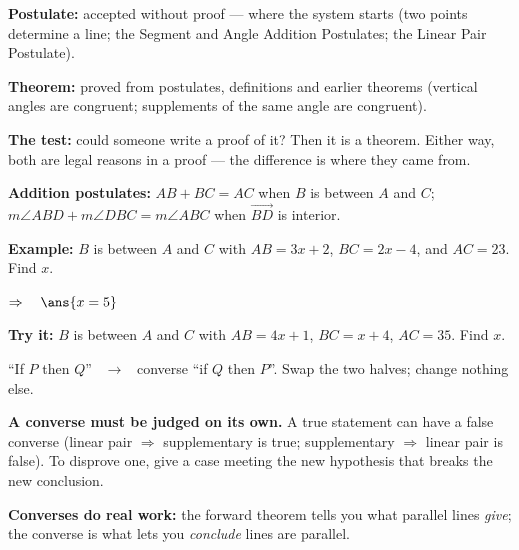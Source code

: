 \documentclass[12pt]{article}
\begin{document}


\begin{formulabox}
\textbf{Postulate:} accepted without proof --- where the system starts (two points determine a line; the Segment and Angle Addition Postulates; the Linear Pair Postulate).\par
\textbf{Theorem:} proved from postulates, definitions and earlier theorems (vertical angles are congruent; supplements of the same angle are congruent).\par
\textbf{The test:} could someone write a proof of it? Then it is a theorem. Either way, both are legal reasons in a proof --- the difference is where they came from.\par
\textbf{Addition postulates:} $AB + BC = AC$ when $B$ is between $A$ and $C$; \ $m\angle ABD + m\angle DBC = m\angle ABC$ when $\overrightarrow{BD}$ is interior.
\end{formulabox}

\begin{examplebox}
\textbf{Example:} \quad $B$ is between $A$ and $C$ with $AB = 3x + 2$, $BC = 2x - 4$, and $AC = 23$. Find $x$.

$\Rightarrow\quad \ans{x = 5}$
\end{examplebox}

\begin{tryitbox}
\textbf{Try it:} \quad $B$ is between $A$ and $C$ with $AB = 4x + 1$, $BC = x + 4$, $AC = 35$. Find $x$.\\[2pt]
\end{tryitbox}


\begin{formulabox}
``If $P$ then $Q$'' \ $\longrightarrow$ \ converse ``if $Q$ then $P$''. Swap the two halves; change nothing else.\par
\textbf{A converse must be judged on its own.} A true statement can have a false converse (linear pair $\Rightarrow$ supplementary is true; supplementary $\Rightarrow$ linear pair is false). To disprove one, give a case meeting the new hypothesis that breaks the new conclusion.\par
\textbf{Converses do real work:} the forward theorem tells you what parallel lines \emph{give}; the converse is what lets you \emph{conclude} lines are parallel.
\end{formulabox}
\end{document}
